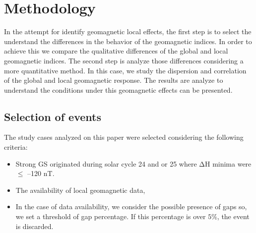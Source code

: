 \documentclass[a4paper, 11pt]{article}
\begin{document}
\section{Methodology}
In the attempt for identify geomagnetic local effects, the first step is to select the 
understand the differences in the behavior of the geomagnetic indices. In order to achieve this we compare the qualitative differences of the global and local geomagnetic indices. The second step is analyze those differences considering a more quantitative method. In this case, we study the dispersion and correlation of the global and local geomagnetic response. The results are analyze to understand the conditions under this geomagnetic effects can be presented.\\ 

\subsection{Selection of events}
The study cases analyzed on this paper were selected considering the following criteria: 

\begin{itemize}
    \item Strong GS originated during solar cycle 24 and or 25 where $\mathrm{\Delta H}$ minima were $\leq$ –120 nT. 
    
    \item The availability of local geomagnetic data,
    
    \item In the case of data availability, we consider the possible presence of gaps so, we set a threshold of gap percentage. If this percentage is over $5\%$, the event is discarded. 
\end{itemize}
\end{document}
